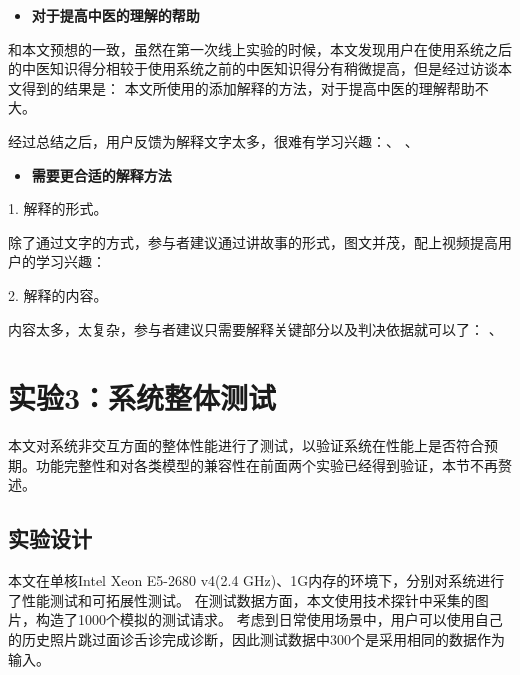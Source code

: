 \begin{itemize}
    \item \textbf{对于提高中医的理解的帮助}
\end{itemize}

和本文预想的一致，虽然在第一次线上实验的时候，本文发现用户在使用系统之后的中医知识得分相较于使用系统之前的中医知识得分有稍微提高，但是经过访谈本文得到的结果是：
本文所使用的添加解释的方法，对于提高中医的理解帮助不大。

经过总结之后，用户反馈为解释文字太多，很难有学习兴趣：、
、


\begin{itemize}
    \item \textbf{需要更合适的解释方法}
\end{itemize}


1. 解释的形式。

除了通过文字的方式，参与者建议通过讲故事的形式，图文并茂，配上视频提高用户的学习兴趣：

2. 解释的内容。

内容太多，太复杂，参与者建议只需要解释关键部分以及判决依据就可以了：
、


\section{实验3：系统整体测试}
本文对系统非交互方面的整体性能进行了测试，以验证系统在性能上是否符合预期。功能完整性和对各类模型的兼容性在前面两个实验已经得到验证，本节不再赘述。

\subsection{实验设计}

本文在单核Intel Xeon E5-2680 v4(2.4 GHz)、1G内存的环境下，分别对系统进行了性能测试和可拓展性测试。
在测试数据方面，本文使用技术探针中采集的图片，构造了1000个模拟的测试请求。
考虑到日常使用场景中，用户可以使用自己的历史照片跳过面诊舌诊完成诊断，因此测试数据中300个是采用相同的数据作为输入。


